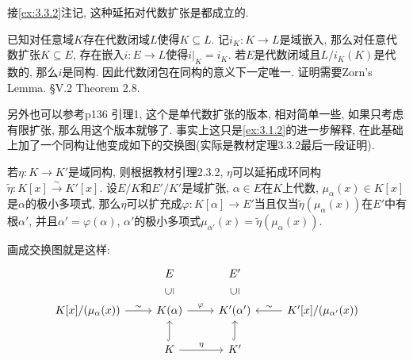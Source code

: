 \begin{remark}
    接\ref{ex:3.3.2}注记, 这种延拓对代数扩张是都成立的. 

    \begin{propstar}
        已知对任意域$K$存在代数闭域$L$使得$K \subseteq L$. 记$i_K:K \to L$是域嵌入, 那么对任意代数扩张$K \subseteq E$, 存在嵌入$i:E \to L$使得$i|_K = i_K$. 若$E$是代数闭域且$L/i_K(K)$是代数的, 那么$i$是同构. 因此代数闭包在同构的意义下一定唯一. 证明需要Zorn's Lemma. \cite{lang2012algebra} \S V.2 Theorem 2.8. 
    \end{propstar}
    另外也可以参考\cite{2009近世代数引论}p136 引理1, 这个是单代数扩张的版本, 相对简单一些, 如果只考虑有限扩张, 那么用这个版本就够了. 事实上这只是\ref{ex:3.1.2}的进一步解释, 在此基础上加了一个同构让他变成如下的交换图(实际是教材定理3.3.2最后一段证明).
    
    \begin{propstar}
        若$\eta:K \to K'$是域同构, 则根据教材引理2.3.2, $\eta$可以延拓成环同构$\tilde{\eta}:K[x] \xrightarrow{\sim} K'[x]$. 设$E/K$和$E'/K'$是域扩张, $\alpha \in E$在$K$上代数, $\mu_\alpha(x) \in K[x]$是$\alpha$的极小多项式, 那么$\eta$可以扩充成$\varphi:K[\alpha] \to E'$当且仅当$\tilde{\eta}(\mu_\alpha(x))$在$E'$中有根$\alpha'$, 并且$\alpha' = \varphi(\alpha)$, $\alpha'$的极小多项式$\mu_{\alpha'}(x) = \tilde{\eta}(\mu_\alpha(x))$.
    \end{propstar}

    画成交换图就是这样:
    \[
        \begin{tikzcd}
            & E                                                              & E'                                          &                                               \\
{K[x]/(\mu_\alpha(x))} \arrow[r, "\sim"] & K(\alpha) \arrow[r, "\varphi"] \arrow[u, "\subseteq", phantom, sloped] & K'(\alpha') \arrow[u, "\subseteq", phantom, sloped] & {K'[x]/(\mu_{\alpha'}(x))} \arrow[l, "\sim"'] \\
            & K \arrow[r, "\eta"] \arrow[u, hook]                            & K' \arrow[u, hook]                          &                                              
        \end{tikzcd}
    \]
    

\end{remark}
